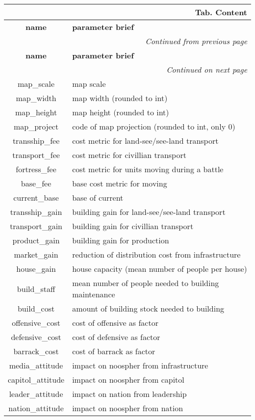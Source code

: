 \documentclass[a4paper,oneside,titlepage]{report}
\newcommand*{\LTHeaderII}[3]{
  \multicolumn{2}{r}{\textbf{Tab. \thesubsection} \textbf{#1}}\\    
  \hline
  \textbf{#2} & \textbf{#3}\\
  \hline

  \endfirsthead
  \multicolumn{2}{r}{\textit{Continued from previous page}}\\    
  \hline
  \textbf{#2} & \textbf{#3}\\
  \hline
  \endhead
  \hline
  \multicolumn{2}{r}{\textit{Continued on next page}}\\
  \endfoot
  \hline
  \endlastfoot  
}
\begin{document}
  \vspace{-0.5cm}
  \begin{longtable}{ |c|l| } 
    \LTHeaderII{Content}{name}{parameter brief}                    
    map\_scale  & map scale\\
    map\_width  & map width (rounded to int)\\
    map\_height  & map height (rounded to int)\\
    map\_project  & code of map projection (rounded to int, only 0)\\
    \hline
    transship\_fee  & cost metric for land-see$/$see-land transport\\
    transport\_fee  & cost metric for civillian transport\\
    fortress\_fee  & cost metric for units moving during a battle\\      
    base\_fee  & base cost metric for moving\\      
    current\_base  & base of current\\      
    \hline
    transship\_gain  & building gain for land-see$/$see-land transport\\
    transport\_gain  & building gain for civillian transport\\
    product\_gain  & building gain for production\\
    market\_gain  & reduction of distribution cost from infrastructure\\      
    house\_gain  & house capacity (mean number of people per house)\\      
    \hline
    build\_staff & mean number of people needed to building maintenance\\      
    build\_cost & amount of building stock needed to building\\      
    \hline
    offensive\_cost & cost of offensive as factor\\      
    defensive\_cost & cost of defensive as factor\\      
    barrack\_cost  & cost of barrack as factor\\      
    \hline
    media\_attitude & impact on noospher from infrastructure\\      
    capitol\_attitude & impact on noospher from capitol\\      
    leader\_attitude & impact on nation from leadership\\      
    nation\_attitude & impact on noospher from nation\\      
    \hline

\end{longtable}
\end{document}
